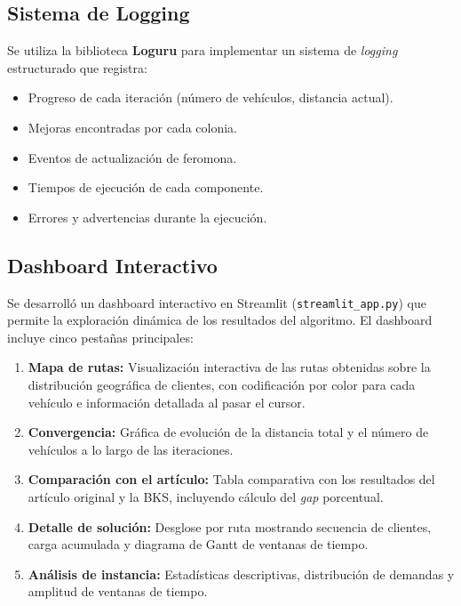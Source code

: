 \documentclass[12pt, letterpaper]{article}
\begin{document}
\subsection{Sistema de Logging}
\label{subsec:logging}

Se utiliza la biblioteca \textbf{Loguru} para implementar un sistema de \textit{logging} estructurado que registra:
\begin{itemize}[leftmargin=2cm]
  \item Progreso de cada iteración (número de vehículos, distancia actual).
  \item Mejoras encontradas por cada colonia.
  \item Eventos de actualización de feromona.
  \item Tiempos de ejecución de cada componente.
  \item Errores y advertencias durante la ejecución.
\end{itemize}

\subsection{Dashboard Interactivo}
\label{subsec:dashboard}

Se desarrolló un dashboard interactivo en Streamlit (\texttt{streamlit\_app.py}) que permite la exploración dinámica de los resultados del algoritmo. El dashboard incluye cinco pestañas principales:

\begin{enumerate}[leftmargin=2cm]
  \item \textbf{Mapa de rutas:} Visualización interactiva de las rutas obtenidas sobre la distribución geográfica de clientes, con codificación por color para cada vehículo e información detallada al pasar el cursor.
  \item \textbf{Convergencia:} Gráfica de evolución de la distancia total y el número de vehículos a lo largo de las iteraciones.
  \item \textbf{Comparación con el artículo:} Tabla comparativa con los resultados del artículo original y la BKS, incluyendo cálculo del \textit{gap} porcentual.
  \item \textbf{Detalle de solución:} Desglose por ruta mostrando secuencia de clientes, carga acumulada y diagrama de Gantt de ventanas de tiempo.
  \item \textbf{Análisis de instancia:} Estadísticas descriptivas, distribución de demandas y amplitud de ventanas de tiempo.
\end{enumerate}
\end{document}
